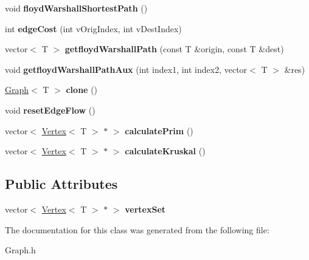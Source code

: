 \begin{DoxyCompactItemize}
\item 
\hypertarget{classGraph_ae5161f4408bf1ead2b29d19d67fb04ee}{void {\bfseries floyd\-Warshall\-Shortest\-Path} ()}\label{classGraph_ae5161f4408bf1ead2b29d19d67fb04ee}

\item 
\hypertarget{classGraph_a7e137f1ef838395ac1044a944fa54448}{int {\bfseries edge\-Cost} (int v\-Orig\-Index, int v\-Dest\-Index)}\label{classGraph_a7e137f1ef838395ac1044a944fa54448}

\item 
\hypertarget{classGraph_a8d64c7cae3712215a4d9d7b2a1018444}{vector$<$ T $>$ {\bfseries getfloyd\-Warshall\-Path} (const T \&origin, const T \&dest)}\label{classGraph_a8d64c7cae3712215a4d9d7b2a1018444}

\item 
\hypertarget{classGraph_aad1eda4beb8425d03ed1f3b8af397563}{void {\bfseries getfloyd\-Warshall\-Path\-Aux} (int index1, int index2, vector$<$ T $>$ \&res)}\label{classGraph_aad1eda4beb8425d03ed1f3b8af397563}

\item 
\hypertarget{classGraph_a63c6f899a8bd788cc39c977defd15885}{\hyperlink{classGraph}{Graph}$<$ T $>$ {\bfseries clone} ()}\label{classGraph_a63c6f899a8bd788cc39c977defd15885}

\item 
\hypertarget{classGraph_a8bf372ab4fb01cab6c88f3a2def1d545}{void {\bfseries reset\-Edge\-Flow} ()}\label{classGraph_a8bf372ab4fb01cab6c88f3a2def1d545}

\item 
\hypertarget{classGraph_a0b41e13d9b298f0d89bc7d5c8e902054}{vector$<$ \hyperlink{classVertex}{Vertex}$<$ T $>$ $\ast$ $>$ {\bfseries calculate\-Prim} ()}\label{classGraph_a0b41e13d9b298f0d89bc7d5c8e902054}

\item 
\hypertarget{classGraph_a04426d0a2328f68415192f35a31be9c3}{vector$<$ \hyperlink{classVertex}{Vertex}$<$ T $>$ $\ast$ $>$ {\bfseries calculate\-Kruskal} ()}\label{classGraph_a04426d0a2328f68415192f35a31be9c3}

\end{DoxyCompactItemize}
\subsection*{Public Attributes}
\begin{DoxyCompactItemize}
\item 
\hypertarget{classGraph_a73d4e735fc0a7c83c9c689a2b53fa623}{vector$<$ \hyperlink{classVertex}{Vertex}$<$ T $>$ $\ast$ $>$ {\bfseries vertex\-Set}}\label{classGraph_a73d4e735fc0a7c83c9c689a2b53fa623}

\end{DoxyCompactItemize}


The documentation for this class was generated from the following file\-:\begin{DoxyCompactItemize}
\item 
Graph.\-h\end{DoxyCompactItemize}
